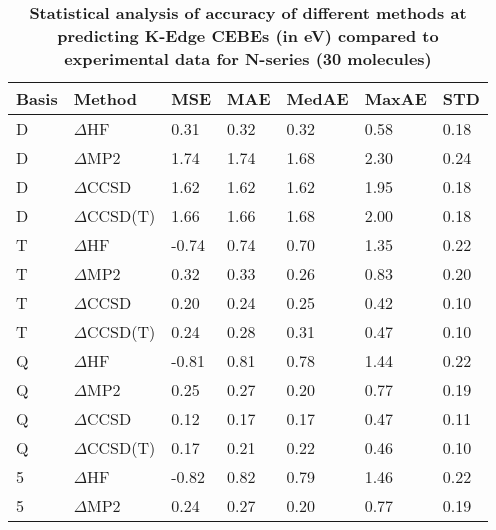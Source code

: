 \begin{table}
  \caption{\textbf{Statistical analysis of accuracy of different methods at predicting K-Edge CEBEs (in eV) compared to experimental data for N-series (30 molecules)}}
  \label{tbl:method-summary-n}
  \begin{tabular}{l l l l l l l }
    \toprule
    \textbf{Basis} & \textbf{Method} & \textbf{MSE} & \textbf{MAE} & \textbf{MedAE} & \textbf{MaxAE} & \textbf{STD} \\ 
    \midrule
    D & $\Delta$HF & 0.31 & 0.32 & 0.32 & 0.58 & 0.18 \\ 
    D & $\Delta$MP2 & 1.74 & 1.74 & 1.68 & 2.30 & 0.24 \\ 
    D & $\Delta$CCSD & 1.62 & 1.62 & 1.62 & 1.95 & 0.18 \\ 
    D & $\Delta$CCSD(T) & 1.66 & 1.66 & 1.68 & 2.00 & 0.18 \\ 
    T & $\Delta$HF & -0.74 & 0.74 & 0.70 & 1.35 & 0.22 \\ 
    T & $\Delta$MP2 & 0.32 & 0.33 & 0.26 & 0.83 & 0.20 \\ 
    T & $\Delta$CCSD & 0.20 & 0.24 & 0.25 & 0.42 & 0.10 \\ 
    T & $\Delta$CCSD(T) & 0.24 & 0.28 & 0.31 & 0.47 & 0.10 \\ 
    Q & $\Delta$HF & -0.81 & 0.81 & 0.78 & 1.44 & 0.22 \\ 
    Q & $\Delta$MP2 & 0.25 & 0.27 & 0.20 & 0.77 & 0.19 \\ 
    Q & $\Delta$CCSD & 0.12 & 0.17 & 0.17 & 0.47 & 0.11 \\ 
    Q & $\Delta$CCSD(T) & 0.17 & 0.21 & 0.22 & 0.46 & 0.10 \\ 
    5 & $\Delta$HF & -0.82 & 0.82 & 0.79 & 1.46 & 0.22 \\ 
    5 & $\Delta$MP2 & 0.24 & 0.27 & 0.20 & 0.77 & 0.19 \\ 
    \bottomrule
  \end{tabular}
\end{table}
